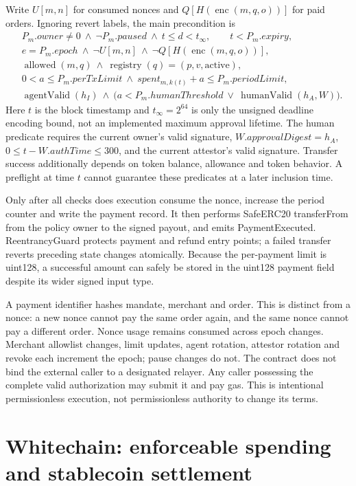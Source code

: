 \documentclass[11pt]{article}
\begin{document}
Write $U[m,n]$ for consumed nonces and $Q[H(\operatorname{enc}(m,q,o))]$ for paid orders. Ignoring revert labels, the main precondition is
\begin{align*}
 &P_m.owner\ne0\ \land\ \neg P_m.paused\ \land\ t\le d<t_{\infty},\qquad t<P_m.expiry,\\
 &e=P_m.epoch\ \land\ \neg U[m,n]\ \land\ \neg Q[H(\operatorname{enc}(m,q,o))],\\
 &\operatorname{allowed}(m,q)\ \land\ \operatorname{registry}(q)=(p,v,\mathrm{active}),\\
 &0<a\le P_m.perTxLimit\ \land\ spent_{m,k(t)}+a\le P_m.periodLimit,\\
 &\operatorname{agentValid}(h_I)\ \land\
 \bigl(a<P_m.humanThreshold\ \lor\ \operatorname{humanValid}(h_A,W)\bigr).
\end{align*}
Here $t$ is the block timestamp and $t_{\infty}=2^{64}$ is only the unsigned deadline encoding bound, not an implemented maximum approval lifetime. The human predicate requires the current owner's valid signature, $W.approvalDigest=h_A$, $0\le t-W.authTime\le300$, and the current attestor's valid signature. Transfer success additionally depends on token balance, allowance and token behavior. A preflight at time $t$ cannot guarantee these predicates at a later inclusion time.

Only after all checks does execution consume the nonce, increase the period counter and write the payment record. It then performs SafeERC20 transferFrom from the policy owner to the signed payout, and emits PaymentExecuted. ReentrancyGuard protects payment and refund entry points; a failed transfer reverts preceding state changes atomically. Because the per-payment limit is uint128, a successful amount can safely be stored in the uint128 payment field despite its wider signed input type.

A payment identifier hashes mandate, merchant and order. This is distinct from a nonce: a new nonce cannot pay the same order again, and the same nonce cannot pay a different order. Nonce usage remains consumed across epoch changes. Merchant allowlist changes, limit updates, agent rotation, attestor rotation and revoke each increment the epoch; pause changes do not. The contract does not bind the external caller to a designated relayer. Any caller possessing the complete valid authorization may submit it and pay gas. This is intentional permissionless execution, not permissionless authority to change its terms.

\section{Whitechain: enforceable spending and stablecoin settlement}
\end{document}
